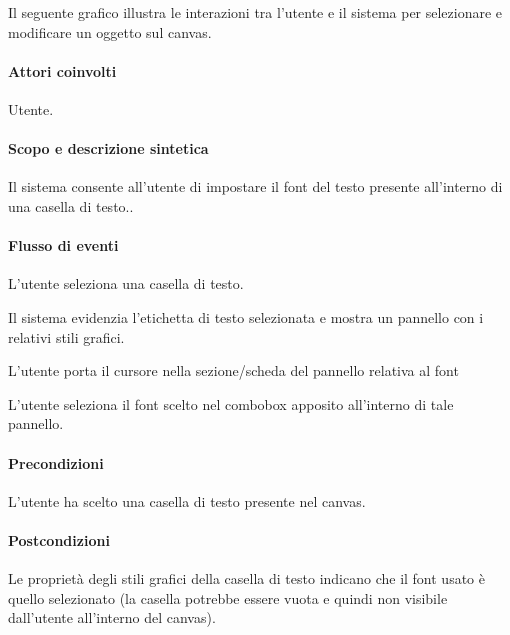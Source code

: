 \label{ucselezionaemodifica}
Il seguente grafico illustra le interazioni tra l'utente e il sistema per selezionare e modificare un oggetto sul canvas.


\paragraph{Attori coinvolti} Utente.
\paragraph{Scopo e descrizione sintetica} 
Il sistema consente all'utente di impostare il font del testo presente all'interno di una casella di testo..
\paragraph{Flusso di eventi}
\begin{elenconumerato}[\textbf{}]{\subsubsecindent}
\item L'utente seleziona una casella di testo.
\item Il sistema evidenzia l'etichetta di testo selezionata e mostra un pannello con i relativi stili grafici.
\item L'utente porta il cursore nella sezione/scheda del pannello relativa al font
\item L'utente seleziona il font scelto nel combobox apposito all'interno di tale pannello.
\end{elenconumerato}
\paragraph{Precondizioni} L'utente ha scelto una casella di testo presente nel canvas.
\paragraph{Postcondizioni} Le propriet\` a degli stili grafici della casella di testo indicano che il font usato \` e quello selezionato (la casella potrebbe essere vuota e quindi non visibile dall'utente all'interno del canvas).

